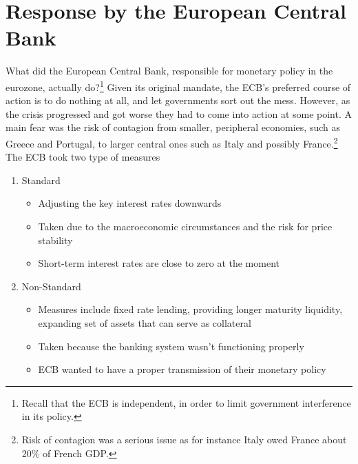 \documentclass{tufte-handout}
\begin{document}
\section{Response by the European Central Bank}
What did the European Central Bank, responsible for monetary policy in the eurozone, actually do?\footnote{Recall that the ECB is independent, in order to limit government interference in its policy.}
Given its original mandate, the ECB's preferred course of action is to do nothing at all, and let governments sort out the mess.
However, as the crisis progressed and got worse they had to come into action at some point. 
A main fear was the risk of contagion from smaller, peripheral economies, such as Greece and Portugal, to larger central ones such as Italy and possibly France.\footnote{Risk of contagion was a serious issue as for instance Italy owed France about 20\% of French GDP.} 
The ECB took two type of measures
\begin{enumerate}
  \item Standard
  \begin{itemize}
    \item Adjusting the key interest rates downwards
    \item Taken due to the macroeconomic circumstances and the risk for price stability
    \item Short-term interest rates are close to zero at the moment
  \end{itemize}
  \item Non-Standard
  \begin{itemize}
    \item Measures include fixed rate lending, providing longer maturity liquidity, expanding set of assets that can serve as collateral
    \item Taken because the banking system wasn't functioning properly
    \item ECB wanted to have a proper transmission of their monetary policy    
  \end{itemize}
\end{enumerate}
\end{document}
